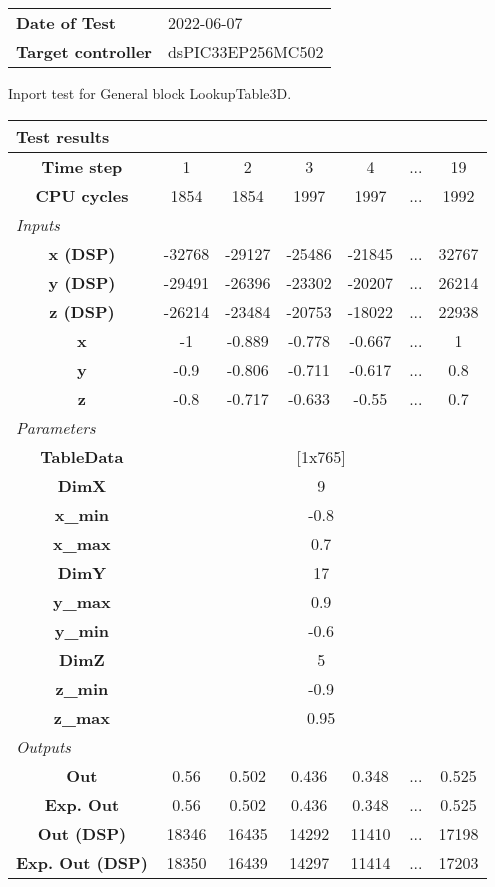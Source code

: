 \begin{tabular}{l l}
\textbf{Date of Test} & 2022-06-07 \tabularnewline
\textbf{Target controller} & dsPIC33EP256MC502 \tabularnewline
\end{tabular}
\vspace{1ex}
Inport test for General block LookupTable3D.

\vspace{1em}
\begin{tabularx}{\textwidth}{|c|c|c|c|c|>{\centering\arraybackslash}X|c|}
\hline
\multicolumn{7}{|l|}{\cellcolor[gray]{0.8}\textbf{Test results}} \tabularnewline \hline
\textbf{Time step} & 1 & 2 & 3 & 4 & ... & 19 \tabularnewline \hline
\textbf{CPU cycles} & 1854 & 1854 & 1997 & 1997 & ... & 1992 \tabularnewline \hline
\multicolumn{7}{|l|}{\cellcolor[gray]{0.9}\textit{Inputs}} \tabularnewline \hline
\textbf{x (DSP)} & -32768 & -29127 & -25486 & -21845 & ... & 32767 \tabularnewline \hline
\textbf{y (DSP)} & -29491 & -26396 & -23302 & -20207 & ... & 26214 \tabularnewline \hline
\textbf{z (DSP)} & -26214 & -23484 & -20753 & -18022 & ... & 22938 \tabularnewline \hline
\textbf{x} & -1 & -0.889 & -0.778 & -0.667 & ... & 1 \tabularnewline \hline
\textbf{y} & -0.9 & -0.806 & -0.711 & -0.617 & ... & 0.8 \tabularnewline \hline
\textbf{z} & -0.8 & -0.717 & -0.633 & -0.55 & ... & 0.7 \tabularnewline \hline
\multicolumn{7}{|l|}{\cellcolor[gray]{0.9}\textit{Parameters}} \tabularnewline \hline
\textbf{TableData} & \multicolumn{6}{c|}{[1x765]} \tabularnewline \hline
\textbf{DimX} & \multicolumn{6}{c|}{9} \tabularnewline \hline
\textbf{x\_min} & \multicolumn{6}{c|}{-0.8} \tabularnewline \hline
\textbf{x\_max} & \multicolumn{6}{c|}{0.7} \tabularnewline \hline
\textbf{DimY} & \multicolumn{6}{c|}{17} \tabularnewline \hline
\textbf{y\_max} & \multicolumn{6}{c|}{0.9} \tabularnewline \hline
\textbf{y\_min} & \multicolumn{6}{c|}{-0.6} \tabularnewline \hline
\textbf{DimZ} & \multicolumn{6}{c|}{5} \tabularnewline \hline
\textbf{z\_min} & \multicolumn{6}{c|}{-0.9} \tabularnewline \hline
\textbf{z\_max} & \multicolumn{6}{c|}{0.95} \tabularnewline \hline
\multicolumn{7}{|l|}{\cellcolor[gray]{0.9}\textit{Outputs}} \tabularnewline \hline
\textbf{Out} & 0.56 & 0.502 & 0.436 & 0.348 & ... & 0.525 \tabularnewline \hline
\textbf{Exp. Out} & 0.56 & 0.502 & 0.436 & 0.348 & ... & 0.525 \tabularnewline \hline
\textbf{Out (DSP)} & 18346 & 16435 & 14292 & 11410 & ... & 17198 \tabularnewline \hline
\textbf{Exp. Out (DSP)} & 18350 & 16439 & 14297 & 11414 & ... & 17203 \tabularnewline \hline
\end{tabularx}
\vspace{1ex}

